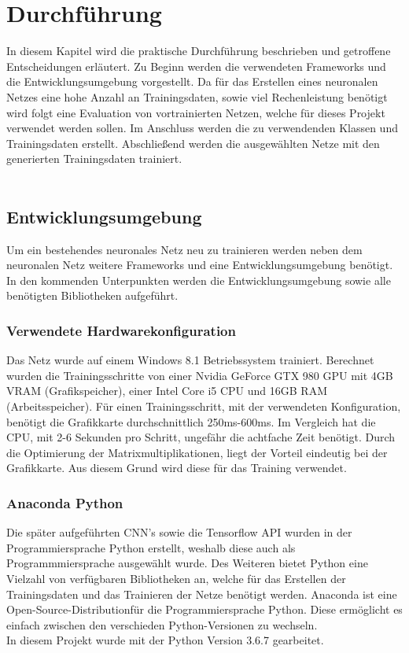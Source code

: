\documentclass[a4paper,12pt,oneside]{article}
\begin{document}
\newpage

  \section{Durchführung}
In diesem Kapitel wird die praktische Durchführung beschrieben und getroffene Entscheidungen erläutert. Zu Beginn werden die verwendeten Frameworks und die Entwicklungsumgebung vorgestellt. Da für das Erstellen eines neuronalen Netzes eine hohe Anzahl an Trainingsdaten, sowie viel Rechenleistung benötigt wird folgt eine Evaluation von vortrainierten Netzen, welche für dieses Projekt verwendet werden sollen. Im Anschluss werden die zu verwendenden Klassen und Trainingsdaten erstellt. Abschließend werden die ausgewählten Netze mit den generierten Trainingsdaten trainiert. \\
\\

\subsection{Entwicklungsumgebung}
Um ein bestehendes neuronales Netz neu zu trainieren werden neben dem neuronalen Netz weitere Frameworks und eine Entwicklungsumgebung benötigt. In den kommenden Unterpunkten werden die Entwicklungsumgebung sowie alle benötigten Bibliotheken aufgeführt. 

  \subsubsection{Verwendete Hardwarekonfiguration}
  \label{konfiguration}
Das Netz wurde auf einem Windows 8.1 Betriebssystem trainiert. Berechnet wurden die Trainingsschritte von einer Nvidia GeForce GTX 980 GPU mit 4GB VRAM (Grafikspeicher), einer Intel Core i5 CPU und 16GB RAM (Arbeitsspeicher). Für einen Trainingsschritt, mit der verwendeten Konfiguration, benötigt die Grafikkarte durchschnittlich 250ms-600ms. Im Vergleich hat die CPU, mit 2-6 Sekunden pro Schritt, ungefähr die achtfache Zeit benötigt. Durch die Optimierung der Matrixmultiplikationen, liegt der Vorteil eindeutig bei der Grafikkarte. Aus diesem Grund wird diese für das Training verwendet.

  \subsubsection{Anaconda Python}
Die später aufgeführten CNN's sowie die Tensorflow API wurden in der Programmiersprache Python erstellt, weshalb diese auch als Programmmiersprache ausgewählt wurde. Des Weiteren bietet Python eine Vielzahl von verfügbaren Bibliotheken an, welche für das Erstellen der Trainingsdaten und das Trainieren der Netze benötigt werden. Anaconda \cite{conda2018} ist eine \glqq Open-Source-Distribution\grqq für die Programmiersprache Python. Diese ermöglicht es einfach zwischen den verschieden Python-Versionen zu wechseln. \\
In diesem Projekt wurde mit der Python Version 3.6.7 gearbeitet.
\end{document}
